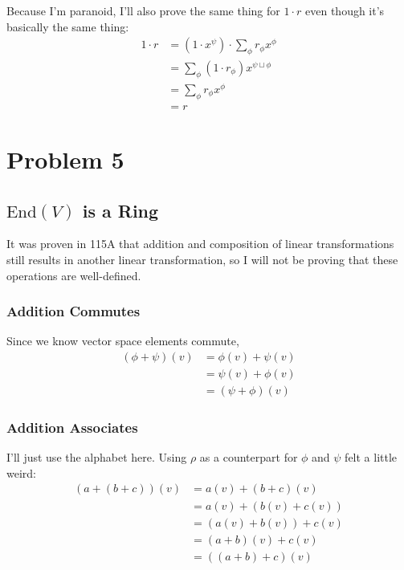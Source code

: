 \documentclass[12pt]{article}
\begin{document}
Because I'm paranoid, I'll also prove the same thing for
$1 \cdot r$ even though it's basically the same thing:
\begin{align*}
  1 \cdot r
  &= (1 \cdot x^\psi) \cdot \sum_{\phi} r_\phi x^\phi \\
  &= \sum_{\phi} (1 \cdot r_\phi)x^{\psi \sqcup \phi} \\
  &= \sum_{\phi} r_\phi x^\phi \\
  &= r
\end{align*}

\pagebreak

\section{Problem 5}

\subsection{\texorpdfstring{$\mathrm{End}(V)$}{End(V)} is a Ring}

It was proven in 115A that addition and composition of linear transformations
still results in another linear transformation, so I will not be proving
that these operations are well-defined.

\subsubsection{Addition Commutes}

Since we know vector space elements commute,
\begin{align*}
  (\phi+\psi)(v)
   & = \phi(v)+\psi(v) \\
   & = \psi(v)+\phi(v) \\
   & = (\psi+\phi)(v)
\end{align*}

\subsubsection{Addition Associates}

I'll just use the alphabet here.
Using $\rho$ as a counterpart for $\phi$ and $\psi$ felt a little weird:
\begin{align*}
  (a+(b+c))(v)
   & = a(v)+(b+c)(v)    \\
   & = a(v)+(b(v)+c(v)) \\
   & = (a(v)+b(v))+c(v) \\
   & = (a+b)(v)+c(v)    \\
   & = ((a+b)+c)(v)
\end{align*}
\end{document}
